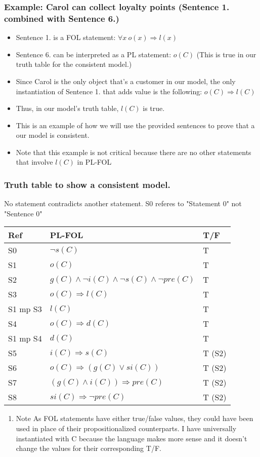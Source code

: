 \documentclass[11pt]{article}
\begin{document}
\subsubsection{Example: Carol can collect loyalty points (Sentence 1. combined with Sentence 6.)}
\label{sec:org407d32e}
\begin{itemize}
\item Sentence 1. is a FOL statement: \(\forall x \: o(x) \Rightarrow l(x)\)
\item Sentence 6. can be interpreted as  a PL statement: \(o(C)\) (This is true in our truth table for the consistent model.)
\item Since Carol is the only object that's a customer in our model, the only instantiation of Sentence 1. that adds value is the following: \(o(C) \Rightarrow l(C)\)
\item Thus, in our model's truth table, \(l(C)\) is true.
\item This is an example of how we will use the provided sentences to prove that a our model is consistent.
\item Note that this example is not critical because there are no other statements that involve \(l(C)\) in PL-FOL
\end{itemize}
\subsubsection{Truth table to show a consistent model.}
\label{sec:orgb45c164}
No statement contradicts another statement.
S0 referes to "Statement 0" not "Sentence 0"
\FloatBarrier
\begin{center}
\begin{tabular}{lll}
Ref & PL-FOL & T/F\\
\hline
S0 & \(\lnot s(C)\) & T\\
S1 & \(o(C)\) & T\\
S2 & \(g(C) \land \lnot i(C) \land \lnot s(C) \land \lnot pre(C)\) & T\\
S3 & \(o(C) \Rightarrow l(C)\) & T\\
S1 mp S3 & \(l(C)\) & T\\
S4 & \(o(C) \Rightarrow d(C)\) & T\\
S1 mp S4 & \(d(C)\) & T\\
S5 & \(i(C) \Rightarrow s(C)\) & T (S2)\\
S6 & \(o(C) \Rightarrow (g(C) \lor si(C))\) & T (S2)\\
S7 & \((g(C) \land i(C)) \Rightarrow pre(C)\) & T (S2)\\
S8 & \(si(C) \Rightarrow \lnot pre(C)\) & T (S2)\\
\end{tabular}
\end{center}
\FloatBarriers
\begin{enumerate}
\item Note
\label{sec:org6baf745}
As FOL statements have either true/false values, they could have been used in place of their propositionalized counterparts. I have universally instantiated with C because the language makes more sense and it doesn't change the values for their corresponding T/F.
\end{enumerate}
\end{document}
